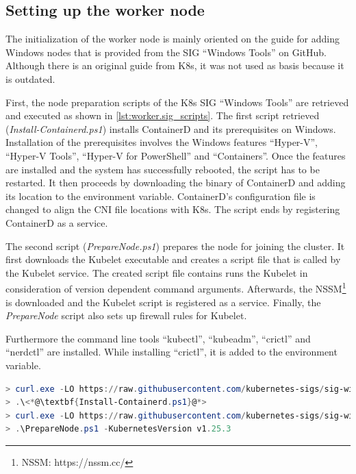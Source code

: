 \subsection{Setting up the worker node}\label{chap:implementation.setup_worker}
The initialization of the worker node is mainly oriented on the guide for adding \ac{Windows} nodes that is provided from the \ac{SIG} \enquote{Windows Tools} on GitHub\cite{GitHubKubernetesSIGWindowsTools.20230213}. Although there is an original guide from \ac{K8s}\cite{Kubernetes.20220419}, it was not used as basis because it is outdated.

First, the node preparation scripts of the \ac{K8s} \ac{SIG} \enquote{Windows Tools} are retrieved and executed as shown in \autoref{lst:worker.sig_scripts}. The first script retrieved (\textit{Install-Containerd.ps1}) installs ContainerD and its prerequisites on \ac{Windows}. Installation of the prerequisites involves the Windows features \enquote{Hyper-V}, \enquote{Hyper-V Tools}, \enquote{Hyper-V for PowerShell} and \enquote{Containers}. Once the features are installed and the system has successfully rebooted, the script has to be restarted. It then proceeds by downloading the binary of ContainerD and adding its location to the  environment variable. ContainerD's configuration file is changed to align the \ac{CNI} file locations with \ac{K8s}. The script ends by registering ContainerD as a service.

The second script (\textit{PrepareNode.ps1}) prepares the node for joining the cluster. It first downloads the Kubelet executable and creates a script file that is called by the Kubelet service. The created script file contains runs the Kubelet in consideration of version dependent command arguments. Afterwards, the \ac{NSSM}\footnote{NSSM: https://nssm.cc/} is downloaded and the Kubelet script is registered as a service. Finally, the \textit{PrepareNode} script also sets up firewall rules for Kubelet.

Furthermore the command line tools \enquote{kubectl}, \enquote{kubeadm}, \enquote{crictl} and \enquote{nerdctl} are installed. While installing \enquote{crictl}, it is added to the  environment variable.

\begin{lstlisting}[label=lst:worker.sig_scripts, caption={Retrieval of node preparation scripts\cite{GitHubKubernetesSIGWindowsTools.20230213}}, language=PowerShell, morekeywords={curl.exe, Install-Containerd.ps1, PrepareNode.ps1}]
> curl.exe -LO https://raw.githubusercontent.com/kubernetes-sigs/sig-windows-tools/master/kubeadm/scripts/Install-Containerd.ps1
> .\<*@\textbf{Install-Containerd.ps1}@*>
> curl.exe -LO https://raw.githubusercontent.com/kubernetes-sigs/sig-windows-tools/master/kubeadm/scripts/Prepare<*@\kern.7pt@*>Node.ps1
> .\PrepareNode.ps1 -KubernetesVersion v1.25.3
\end{lstlisting}

